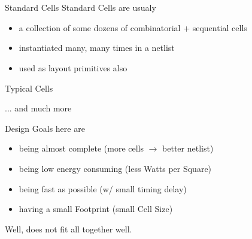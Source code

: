 \documentclass[aspectratio=169]{beamer}
\begin{document}
\section[Standard Cells]{}
\begin{frame}{Standard Cells}
Standard Cells are usualy
	\begin{itemize}
        \setlength\itemsep{1em}
		\item a collection of some dozens of combinatorial + sequential cells
		\item instantiated many, many times in a netlist
		\item used as layout primitives also
	\end{itemize}
\end{frame}

\begin{frame}{Typical Cells}
	\begin{figure}[h]
		\begin{center}
			\begin{circuitdiagram}{25}{25}
			\end{circuitdiagram}
		\end{center}
	\end{figure}

... and much more
\end{frame}

\begin{frame}{Design Goals}
here are
	\begin{itemize}
        \setlength\itemsep{1em}
		\item being almost complete (more cells $\rightarrow$ better netlist)
		\item being low energy consuming (less Watts per Square)
		\item being fast as possible (w/ small timing delay)
		\item having a small Footprint (small Cell Size)
	\end{itemize}

Well, does not fit all together well.
\end{frame}
\end{document}
